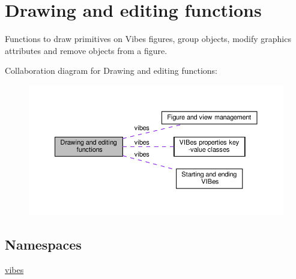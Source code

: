 \hypertarget{group__drawing}{}\section{Drawing and editing functions}
\label{group__drawing}


Functions to draw primitives on Vibes figures, group objects, modify graphics attributes and remove objects from a figure.  


Collaboration diagram for Drawing and editing functions\+:\nopagebreak
\begin{figure}[H]
\begin{center}
\leavevmode
\includegraphics[width=350pt]{group__drawing}
\end{center}
\end{figure}
\subsection*{Namespaces}
\begin{DoxyCompactItemize}
\item 
 \hyperlink{namespacevibes}{vibes}
\end{DoxyCompactItemize}
